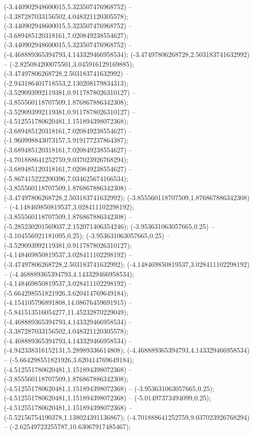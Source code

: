 (-3.440902948600015,5.323507476968752) -- (-3.387287033156502,4.048321120305578);
 (-3.440902948600015,5.323507476968752) -- (-3.689485120318161,7.020849238554627);
 (-3.440902948600015,5.323507476968752) -- (-4.468889365394793,4.143329466958534);
 (-3.47497806268728,2.503183741632992) -- (-2.825084200075501,3.045916129169885);
 (-3.47497806268728,2.503183741632992) -- (-2.943186401718553,2.130208179834313);
 (-3.529093992119381,0.9117878026310127) -- (-3.855560118707509,1.876867886342308);
 (-3.529093992119381,0.9117878026310127) -- (-4.512551780620481,1.151894398072368);
 (-3.689485120318161,7.020849238554627) -- (-1.960998843073157,5.919177237864387);
 (-3.689485120318161,7.020849238554627) -- (-4.701888641252759,9.037023926768294);
 (-3.689485120318161,7.020849238554627) -- (-5.867415222200396,7.034625674166534);
 (-3.855560118707509,1.876867886342308) -- (-3.47497806268728,2.503183741632992);
 (-3.855560118707509,1.876867886342308) -- (-4.148469850819537,3.028411102298192);
 (-3.855560118707509,1.876867886342308) -- (-5.285230201569037,2.152071406354246);
 (-3.953631063057665,0.25) -- (-3.104556921181095,0.25);
 (-3.953631063057665,0.25) -- (-3.529093992119381,0.9117878026310127);
 (-4.148469850819537,3.028411102298192) -- (-3.47497806268728,2.503183741632992);
 (-4.148469850819537,3.028411102298192) -- (-4.468889365394793,4.143329466958534);
 (-4.148469850819537,3.028411102298192) -- (-5.664298551821926,3.620414769649184);
 (-4.154105796891808,14.08676459691915) -- (-5.841513516054277,11.45232870229049);
 (-4.468889365394793,4.143329466958534) -- (-3.387287033156502,4.048321120305578);
 (-4.468889365394793,4.143329466958534) -- (-4.942338316152131,5.28989336614808);
 (-4.468889365394793,4.143329466958534) -- (-5.664298551821926,3.620414769649184);
 (-4.512551780620481,1.151894398072368) -- (-3.855560118707509,1.876867886342308);
 (-4.512551780620481,1.151894398072368) -- (-3.953631063057665,0.25);
 (-4.512551780620481,1.151894398072368) -- (-5.01497373494099,0.25);
 (-4.512551780620481,1.151894398072368) -- (-5.52156754190378,1.138024391136867);
 (-4.701888641252759,9.037023926768294) -- (-2.62549723255787,10.63067917485467);

